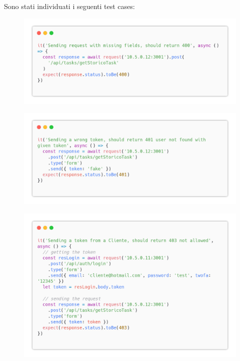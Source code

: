 \documentclass{report}
\begin{document}
Sono stati individuati i seguenti test cases:
\begin{figure}[H]
	\centering\includegraphics[width=1\textwidth]{images/code_storico_test1.png}
\end{figure}
\begin{figure}[H]
	\centering\includegraphics[width=1\textwidth]{images/code_storico_test2.png}
\end{figure}
\begin{figure}[H]
	\centering\includegraphics[width=1\textwidth]{images/code_storico_test3.png}
\end{figure}
\end{document}
